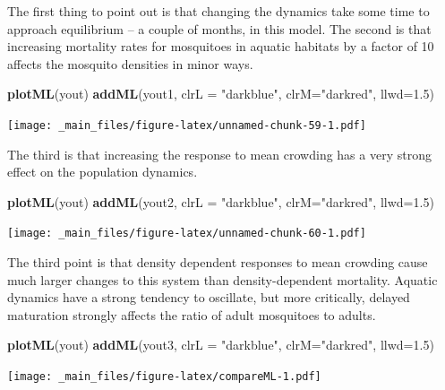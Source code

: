 \documentclass[
]{book}
\newenvironment{Shaded}{\begin{snugshade}}{\end{snugshade}}
\newcommand{\AttributeTok}[1]{\textcolor[rgb]{0.13,0.29,0.53}{#1}}
\newcommand{\FloatTok}[1]{\textcolor[rgb]{0.00,0.00,0.81}{#1}}
\newcommand{\FunctionTok}[1]{\textcolor[rgb]{0.13,0.29,0.53}{\textbf{#1}}}
\newcommand{\NormalTok}[1]{#1}
\newcommand{\StringTok}[1]{\textcolor[rgb]{0.31,0.60,0.02}{#1}}
\begin{document}
The first thing to point out is that changing the dynamics take some time to approach equilibrium -- a couple of months, in this model. The second is that increasing mortality rates for mosquitoes in aquatic habitats by a factor of 10 affects the mosquito densities in minor ways.

\begin{Shaded}
\begin{Highlighting}[]
\FunctionTok{plotML}\NormalTok{(yout)}
\FunctionTok{addML}\NormalTok{(yout1, }\AttributeTok{clrL =} \StringTok{"darkblue"}\NormalTok{, }\AttributeTok{clrM=}\StringTok{"darkred"}\NormalTok{, }\AttributeTok{llwd=}\FloatTok{1.5}\NormalTok{)}
\end{Highlighting}
\end{Shaded}

\texttt{[image: \_main\_files/figure-latex/unnamed-chunk-59-1.pdf]}

The third is that increasing the response to mean crowding has a very strong effect on the population dynamics.

\begin{Shaded}
\begin{Highlighting}[]
\FunctionTok{plotML}\NormalTok{(yout)}
\FunctionTok{addML}\NormalTok{(yout2, }\AttributeTok{clrL =} \StringTok{"darkblue"}\NormalTok{, }\AttributeTok{clrM=}\StringTok{"darkred"}\NormalTok{, }\AttributeTok{llwd=}\FloatTok{1.5}\NormalTok{)}
\end{Highlighting}
\end{Shaded}

\texttt{[image: \_main\_files/figure-latex/unnamed-chunk-60-1.pdf]}

The third point is that density dependent responses to mean crowding cause much larger changes to this system than density-dependent mortality. Aquatic dynamics have a strong tendency to oscillate, but more critically, delayed maturation strongly affects the ratio of adult mosquitoes to adults.

\begin{Shaded}
\begin{Highlighting}[]
\FunctionTok{plotML}\NormalTok{(yout)}
\FunctionTok{addML}\NormalTok{(yout3, }\AttributeTok{clrL =} \StringTok{"darkblue"}\NormalTok{, }\AttributeTok{clrM=}\StringTok{"darkred"}\NormalTok{, }\AttributeTok{llwd=}\FloatTok{1.5}\NormalTok{)}
\end{Highlighting}
\end{Shaded}

\texttt{[image: \_main\_files/figure-latex/compareML-1.pdf]}
\end{document}
